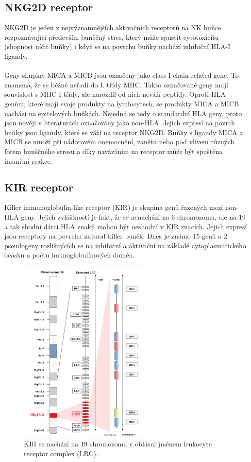 \documentclass[czech,DP]{thesiskiv}
\numberwithin{equation}{section}
\begin{document}
\subsection{NKG2D receptor}
NKG2D je jeden z nejvýznamnějších aktivačních receptorů na NK buňce rozpoznávající především buněčný stres, který může spustit cytotoxicitu (shopnost níčit buňky) i když se na povrchu buňky nachází inhibiční HLA-I ligandy.  
\\
\\
Geny skupiny MICA a MICB jsou označeny jako class I chain-related gene. To znamená, že se běžně neřadí do I. třídy MHC. Takto označované geny mají souvislost s MHC I třídy, ale narozdíl od nich neváží peptidy. Oproti HLA genům, které mají svoje produkty na lymfocytech, se produkty MICA a MICB nachází na epitelových buňkách. Nejedná se tedy o standardní HLA geny, proto jsou nověji v literaturách označovány jako non-HLA. Jejich expresí na povrch buňky jsou ligandy, které se váží na receptor NKG2D. Buňky s ligandy MICA a MICB se množí při nádorovém onemocnění, zanětu nebo pod vlivem různých forem buněčného stresu a díky navázáním na receptor může být spuštěna imunitní reakce. \cite{transfuzni_lekarstvi} \cite{MIC} \cite{NK_receptors} \cite{imgt_hla_database}


\subsection{KIR receptor}
Killer immunoglobulin-like receptor (KIR) je skupina genů řazených mezi non-HLA geny. Jejich zvláštností je fakt, že se nenachází na 6 chromozomu, ale na 19 a tak shodní dárci HLA znaků mohou být neshodní v KIR znacích. Jejich expresí jsou receptory na povrchu natural killer buněk. Dnes je známo 15 genů a 2 pseudogeny rozlišujících se na inhibiční a aktivační na základě cytoplasmatického ocásku a počtu imunoglobulínových domén. \citep{KIR_transplantace_jindra}

\begin{figure}[H]		
		\centering
		\includegraphics[width=250px]{./img/kir_pozice.png}
		\caption{KIR se nachází na 19 chromozomu v oblásni jménem leukocyte receptor complex (LRC). \cite{imgt_hla_database}}
		\label{fig:kir_position}
\end{figure}
\end{document}
